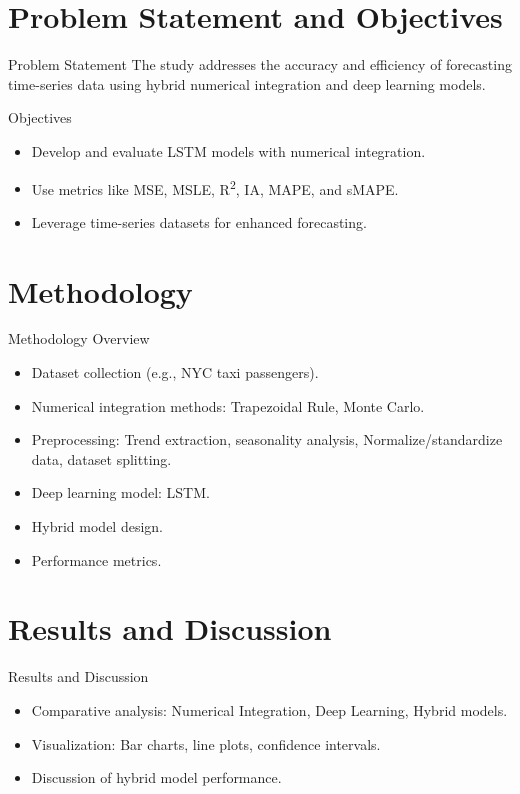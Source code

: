 \documentclass[10pt]{beamer}
\begin{document}
\section{Problem Statement and Objectives}
\begin{frame}{Problem Statement}
    The study addresses the accuracy and efficiency of forecasting time-series data using hybrid numerical integration and deep learning models.
\end{frame}

\begin{frame}{Objectives}
    \begin{itemize}
        \item Develop and evaluate LSTM models with numerical integration.
        \item Use metrics like MSE, MSLE, R\textsuperscript{2}, IA, MAPE, and sMAPE.
        \item Leverage time-series datasets for enhanced forecasting.
    \end{itemize}
\end{frame}

\section{Methodology}
\begin{frame}{Methodology Overview}
    \begin{itemize}
        \item Dataset collection (e.g., NYC taxi passengers).
        \item Numerical integration methods: Trapezoidal Rule, Monte Carlo.
        \item Preprocessing: Trend extraction, seasonality analysis, Normalize/standardize data, dataset splitting.
        \item Deep learning model: LSTM.
        \item Hybrid model design.
        \item Performance metrics.
    \end{itemize}
\end{frame}

\section{Results and Discussion}
\begin{frame}{Results and Discussion}
    \begin{itemize}
        \item Comparative analysis: Numerical Integration, Deep Learning, Hybrid models.
        \item Visualization: Bar charts, line plots, confidence intervals.
        \item Discussion of hybrid model performance.
    \end{itemize}
\end{frame}
\end{document}
